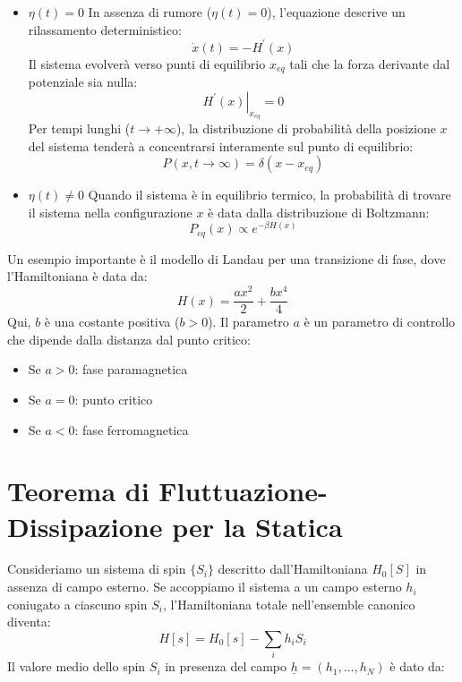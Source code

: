 \begin{itemize}
    \item $\eta(t)=0$
In assenza di rumore ($\eta(t)=0$), l'equazione descrive un rilassamento deterministico:
\begin{equation}
\dot{x}(t)=-H^{\prime}(x)
\end{equation}
Il sistema evolverà verso punti di equilibrio $x_{eq}$ tali che la forza derivante dal potenziale sia nulla:
\begin{equation}
\left. H^{\prime}(x)\right|_{x_{eq}}=0
\end{equation}
Per tempi lunghi ($t\rightarrow+\infty$), la distribuzione di probabilità della posizione $x$ del sistema tenderà a concentrarsi interamente sul punto di equilibrio:
\begin{equation}
P(x,t\rightarrow\infty) = \delta(x-x_{eq})
\end{equation}

\item $\eta(t) \neq 0$
Quando il sistema è in equilibrio termico, la probabilità di trovare il sistema nella configurazione $x$ è data dalla distribuzione di Boltzmann:
\begin{equation}
P_{eq}(x)\propto e^{-\beta H(x)}
\end{equation}
\end{itemize}
Un esempio importante è il modello di Landau per una transizione di fase, dove l'Hamiltoniana è data da:
\begin{equation}
H(x)=\frac{ax^{2}}{2}+\frac{bx^{4}}{4}
\end{equation}
Qui, $b$ è una costante positiva ($b>0$). Il parametro $a$ è un parametro di controllo che dipende dalla distanza dal punto critico:
\begin{itemize}
    \item Se $a>0$: fase paramagnetica
    \item Se $a=0$: punto critico
    \item Se $a<0$: fase ferromagnetica
\end{itemize}

\section{Teorema di Fluttuazione-Dissipazione per la Statica}
Consideriamo un sistema di spin $\{S_i\}$ descritto dall'Hamiltoniana $H_0[S]$ in assenza di campo esterno. Se accoppiamo il sistema a un campo esterno $h_i$ coniugato a ciascuno spin $S_i$, l'Hamiltoniana totale nell'ensemble canonico diventa:
\begin{equation}
H[s]=H_0[s]- \sum_i h_i S_i
\end{equation}
Il valore medio dello spin $S_i$ in presenza del campo $\underline{h}=(h_1, \dots, h_N)$ è dato da:

